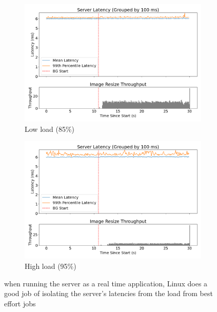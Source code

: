 \begin{figure}[t]
    \centering
    \begin{subfigure}[t]{\columnwidth}
        \includegraphics[width=\columnwidth]{graphs/srv-bg-rt-low.png}
        \caption{Low load (85\%)}\label{fig:srv-bg-rt-low}
        \vspace{12pt}
    \end{subfigure}
    \hspace{\fill}
    \begin{subfigure}[t]{\columnwidth}
        \includegraphics[width=\columnwidth]{graphs/srv-bg-rt-high.png}
        \caption{High load (95\%)}\label{fig:srv-bg-rt-high}
    \end{subfigure}
    \vspace{4pt}
    \caption{when running the server as a real time application, Linux does a
     good job of isolating the server's latencies from the load from best effort
     jobs }\label{fig:srv-bg-rt}
\end{figure}

